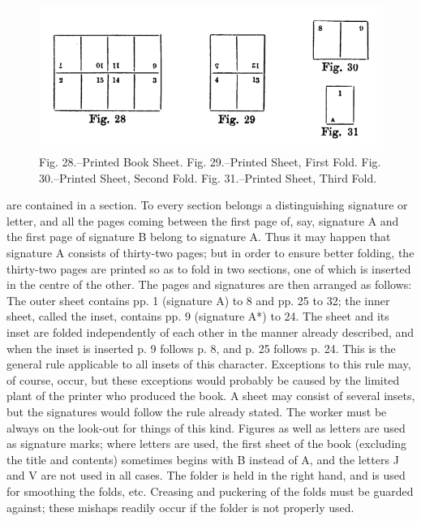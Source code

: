 \documentclass[twoside]{book}
\begin{document}
	\begin{figure}[h]
		\centering
		\includegraphics[width=\textwidth]{Figures/_028-031.png}
		\caption*{
			Fig. 28.--Printed Book Sheet.
			Fig. 29.--Printed Sheet, First Fold.
			Fig. 30.--Printed Sheet, Second Fold.
			Fig. 31.--Printed Sheet, Third Fold.
		}
	\end{figure}
are contained in a section. To every section belongs
a distinguishing signature or letter, and all the
pages coming between the first page of, say, signature
A and the first page of signature B belong to
signature A. Thus it may happen that signature A
consists of thirty-two pages; but in order to ensure
better folding, the thirty-two pages are printed so
as to fold in two sections, one of which is inserted
in the centre of the other. The pages and signatures
are then arranged as follows: The outer sheet
contains pp. 1 (signature A) to 8 and pp. 25 to 32;
the inner sheet, called the inset, contains pp. 9
(signature A*) to 24. The sheet and its inset are
\pagebreak
folded independently of each other in the manner
already described, and when the inset is inserted
p. 9 follows p. 8, and p. 25 follows p. 24. This is
the general rule applicable to all insets of this
character. Exceptions to this rule may, of course,
occur, but these exceptions would probably be
caused by the limited plant of the printer who
produced the book. A sheet may consist of several
insets, but the signatures would follow the rule
already stated. The worker must be always on the
look-out for things of this kind. Figures as well
as letters are used as signature marks; where
letters are used, the first sheet of the book (excluding
the title and contents) sometimes begins with B
instead of A, and the letters J and V are not used in
all cases. The folder is held in the right hand, and
is used for smoothing the folds, etc. Creasing and
puckering of the folds must be guarded against;
these mishaps readily occur if the folder is not
properly used.
\end{document}
